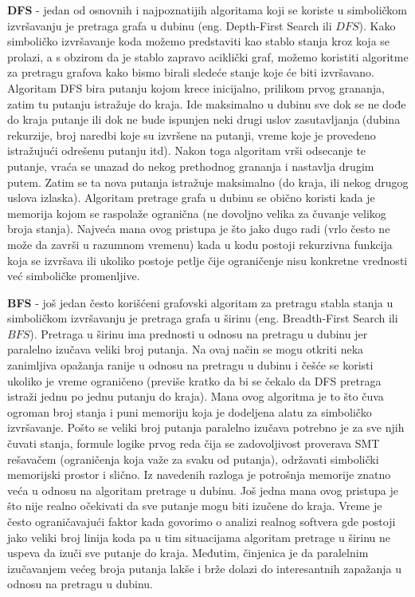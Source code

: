 \documentclass[12pt]{article}
\begin{document}
\bigbreak

\textbf{DFS} - jedan od osnovnih i najpoznatijih algoritama koji se koriste u simboličkom izvršavanju je pretraga grafa u dubinu (eng. Depth-First Search ili $DFS$). Kako simboličko izvršavanje koda možemo predstaviti kao stablo stanja kroz koja se prolazi, a s obzirom da je stablo zapravo aciklički graf, možemo koristiti algoritme za pretragu grafova kako bismo birali sledeće stanje koje će biti izvršavano. Algoritam DFS bira putanju kojom krece inicijalno, prilikom prvog grananja, zatim tu putanju istražuje do kraja. Ide maksimalno u dubinu sve dok se ne dođe do kraja putanje ili dok ne bude ispunjen neki drugi uslov zasutavljanja (dubina rekurzije, broj naredbi koje su izvršene na putanji, vreme koje je provedeno istražujući odrešenu putanju itd). Nakon toga algoritam vrši odsecanje te putanje, vraća se unazad do nekog prethodnog grananja i nastavlja drugim putem. Zatim se ta nova putanja istražuje maksimalno (do kraja, ili nekog drugog uslova izlaska). Algoritam pretrage grafa u dubinu se obično koristi kada je memorija kojom se raspolaže ogranična (ne dovoljno velika za čuvanje velikog broja stanja). Najveća mana ovog pristupa je što jako dugo radi (vrlo često ne može da završi u razumnom vremenu) kada u kodu postoji rekurzivna funkcija koja se izvršava ili ukoliko postoje petlje čije ograničenje nisu konkretne vrednosti već simboličke promenljive. 

\bigbreak

\textbf{BFS} - još jedan često korišćeni grafovski algoritam za pretragu stabla stanja u simboličkom izvršavanju je pretraga grafa u širinu (eng. Breadth-First Search ili $BFS$). Pretraga u širinu ima prednosti u odnosu na pretragu u dubinu jer paralelno izučava veliki broj putanja. Na ovaj način se mogu otkriti neka zanimljiva opažanja ranije u odnosu na pretragu u dubinu i češće se koristi ukoliko je vreme ograničeno (previše kratko da bi se čekalo da DFS pretraga istraži jednu po jednu putanju do kraja). Mana ovog algoritma je to što čuva ogroman broj stanja i puni memoriju koja je dodeljena alatu za simboličko izvršavanje. Pošto se veliki broj putanja paralelno izučava potrebno je za sve njih čuvati stanja, formule logike prvog reda čija se zadovoljivost proverava SMT rešavačem (ograničenja koja važe za svaku od putanja), održavati simbolički memorijski prostor i slično. Iz navedenih razloga je potrošnja memorije znatno veća u odnosu na algoritam pretrage u dubinu. Još jedna mana ovog pristupa je što nije realno očekivati da sve putanje mogu biti izučene do kraja. Vreme je često ograničavajući faktor kada govorimo o analizi realnog softvera gde postoji jako veliki broj linija koda pa u tim situacijama algoritam pretrage u širinu ne uspeva da izuči sve putanje do kraja. Međutim, činjenica je da paralelnim izučavanjem većeg broja putanja lakše i brže dolazi do interesantnih zapažanja u odnosu na pretragu u dubinu.
\end{document}
